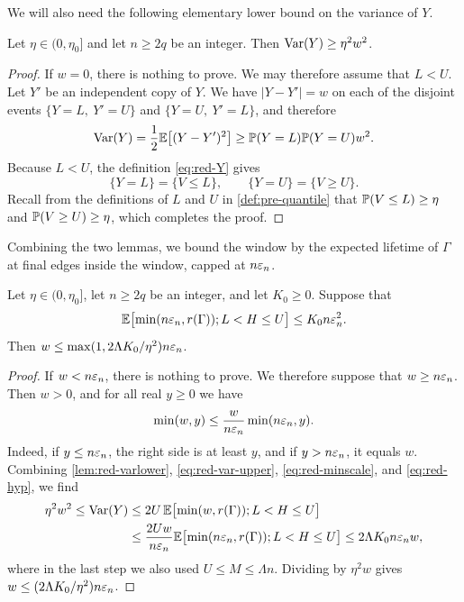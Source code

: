 We will also need the following elementary lower bound on the variance of $Y$.

\begin{lemma}\label{lem:red-varlower}
Let $\eta \in (0, \eta_0]$ and let $n \ge 2q$ be an integer. Then $\operatorname{Var}(Y) \ge \eta^2 w^2$.
\end{lemma}

\begin{proof}
If $w = 0$, there is nothing to prove. We may therefore assume that $L < U$. Let $Y'$ be an independent copy of $Y$. We have $|Y - Y'| = w$ on each of the disjoint events $\{Y = L, \ Y' = U\}$ and $\{Y = U, \ Y' = L\}$, and therefore
\begin{equation*}
\operatorname{Var}(Y) = \frac{1}{2} \mathbb E\bigl[(Y - Y')^2\bigr] \ge \mathbb P(Y = L) \mathbb P(Y = U) w^2.
\end{equation*}
Because $L < U$, the definition \eqref{eq:red-Y} gives
\begin{equation*}
\{Y = L\} = \{V \le L\}, \qquad \{Y = U\} = \{V \ge U\}.
\end{equation*}
Recall from the definitions of $L$ and $U$ in \cref{def:pre-quantile} that $\mathbb P(V \le L) \ge \eta$ and $\mathbb P(V \ge U) \ge \eta$, which completes the proof.
\end{proof}

Combining the two lemmas, we bound the window by the expected lifetime of $\Gamma$ at final edges inside the window, capped at $n \varepsilon_n$.

\begin{proposition}\label{prop:red-window}
Let $\eta \in (0, \eta_0]$, let $n \ge 2q$ be an integer, and let $K_0 \ge 0$. Suppose that
\begin{equation}\label{eq:red-hyp}
\mathbb E\bigl[\min(n \varepsilon_n, r(\Gamma)); L < H \le U\bigr] \le K_0 n \varepsilon_n^2.
\end{equation}
Then $w \le \max(1, 2 \Lambda K_0/\eta^2) n \varepsilon_n$.
\end{proposition}

\begin{proof}
If $w < n \varepsilon_n$, there is nothing to prove. We therefore suppose that $w \ge n \varepsilon_n$. Then $w > 0$, and for all real $y \ge 0$ we have
\begin{equation}\label{eq:red-minscale}
\min(w, y) \le \frac{w}{n \varepsilon_n} \min(n \varepsilon_n, y).
\end{equation}
Indeed, if $y \le n \varepsilon_n$, the right side is at least $y$, and if $y > n \varepsilon_n$, it equals $w$. Combining \cref{lem:red-varlower}, \eqref{eq:red-var-upper}, \eqref{eq:red-minscale}, and \eqref{eq:red-hyp}, we find
\begin{equation*}
\begin{split}
\eta^2 w^2 \le \operatorname{Var}(Y) &\le 2U \, \mathbb E\bigl[\min(w, r(\Gamma)); L < H \le U\bigr] \\
&\le \frac{2Uw}{n \varepsilon_n} \mathbb E\bigl[\min(n \varepsilon_n, r(\Gamma)); L < H \le U\bigr] \le 2 \Lambda K_0 n \varepsilon_n w,
\end{split}
\end{equation*}
where in the last step we also used $U \le M \le \Lambda n$. Dividing by $\eta^2 w$ gives $w \le (2 \Lambda K_0/\eta^2) n \varepsilon_n$.
\end{proof}

